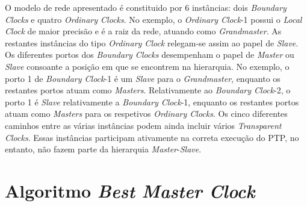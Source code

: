 O modelo de rede apresentado é constituido por 6 instâncias: dois \textit{Boundary Clocks} e quatro \textit{Ordinary Clocks}. No exemplo, o \textit{Ordinary Clock}-1 possui o \textit{Local Clock} de maior precisão e é a raiz da rede, atuando como \textit{Grandmaster}. As restantes instâncias do tipo \textit{Ordinary Clock} relegam-se assim ao papel de \textit{Slave}. Os diferentes portos dos \textit{Boundary Clocks} desempenham o papel de \textit{Master} ou \textit{Slave} consoante a posição em que se encontrem na hierarquia. No exemplo, o porto 1 de \textit{Boundary Clock}-1 é um \textit{Slave} para o \textit{Grandmaster}, enquanto os restantes portos atuam como \textit{Masters}. Relativamente ao \textit{Boundary Clock}-2, o porto 1 é \textit{Slave} relativamente a \textit{Boundary Clock}-1, enquanto os restantes portos atuam como \textit{Masters} para os respetivos \textit{Ordinary Clocks}. Os cinco diferentes caminhos entre as várias instâncias podem ainda incluir vários \textit{Transparent Clocks}. Essas instâncias participam ativamente na correta execução do PTP, no entanto, não fazem parte da hierarquia \textit{Master}-\textit{Slave}. \par

\section{Algoritmo \textit{Best Master Clock}}
\label{section:overview}


